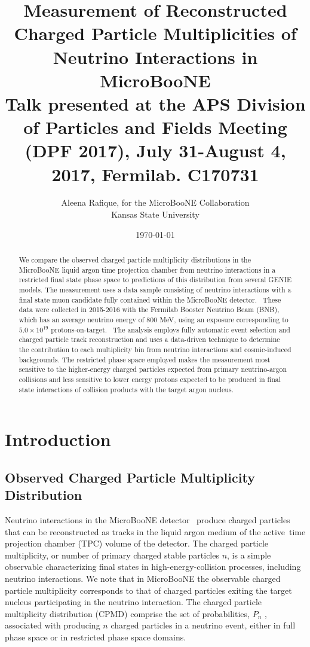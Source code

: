 \documentclass{article}
\title{Measurement of Reconstructed Charged Particle Multiplicities of Neutrino Interactions in MicroBooNE\\{\normalsize {Talk presented at the APS Division of Particles and Fields Meeting (DPF 2017), July 31-August 4, 2017, Fermilab. C170731}}}
\author{Aleena Rafique, for the MicroBooNE Collaboration\\ {\normalsize {Kansas State University}}}
\date{\Large{\today}}
\begin{document}
\maketitle
\begin{abstract}
We compare the observed charged particle multiplicity distributions
in the MicroBooNE liquid argon time projection chamber from neutrino
interactions in a restricted final state phase space to predictions of this
distribution from several GENIE models. The measurement uses a data sample
consisting of neutrino interactions with a final state muon candidate fully
contained within the MicroBooNE detector. \ These data were collected in
2015-2016 with the Fermilab Booster Neutrino Beam (BNB), which has an average
neutrino energy of $800$ MeV, using an exposure corresponding to $%
5.0\times10^{19}$ protons-on-target. \ The analysis employs fully automatic
event selection and charged particle track reconstruction and uses a
data-driven technique to determine the contribution to each multiplicity bin from neutrino interactions and cosmic-induced backgrounds. The restricted phase space employed makes the measurement most
sensitive to the higher-energy charged particles expected from primary
neutrino-argon collisions and less sensitive to lower energy protons
expected to be produced in final state interactions of collision products
with the target argon nucleus.
\end{abstract}

\tableofcontents

\newpage\newpage

\section{Introduction}

\subsection{Observed Charged Particle Multiplicity Distribution}

Neutrino interactions in the MicroBooNE detector~\cite{MicroBooNE detector}
produce charged particles that can be reconstructed as tracks in the liquid
argon medium of the active\ time projection chamber (TPC) volume of the detector. The charged
particle multiplicity, or number of primary charged stable particles $n$, is
a simple observable characterizing final states in high-energy-collision
processes, including neutrino interactions. We note that in MicroBooNE the observable charged particle multiplicity corresponds to that of charged particles exiting the target nucleus participating in the neutrino interaction. The charged particle
multiplicity distribution (CPMD) comprise the set of probabilities, $P_{n}$%
, associated with producing $n$ charged particles in a neutrino event, either in
full phase space or in restricted phase space domains.
\end{document}
